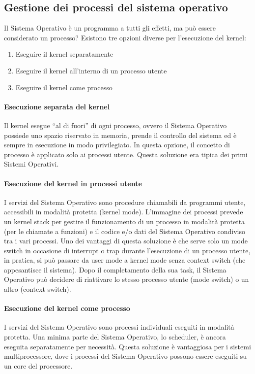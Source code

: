 \documentclass[a4paper]{article}
\begin{document}
\subsection{Gestione dei processi del sistema operativo}
Il Sistema Operativo è un programma a tutti gli effetti, ma può essere considerato un processo? Esistono tre opzioni diverse per l'esecuzione del kernel:
\begin{enumerate}
    \item Eseguire il kernel separatamente
    \item Eseguire il kernel all'interno di un processo utente
    \item Eseguire il kernel come processo
\end{enumerate}

\paragraph{Esecuzione separata del kernel} Il kernel esegue ``al di fuori'' di ogni processo, ovvero il Sistema Operativo possiede uno spazio riservato in memoria, prende il controllo del sistema ed è sempre in esecuzione in modo privilegiato. In questa opzione, il concetto di processo è applicato solo ai processi utente. Questa soluzione era tipica dei primi Sistemi Operativi.

\paragraph{Esecuzione del kernel in processi utente} I servizi del Sistema Operativo sono procedure chiamabili da programmi utente, accessibili in modalità protetta (kernel mode). L'immagine dei processi prevede un kernel stack per gestire il funzionamento di un processo in modalità protetta (per le chiamate a funzioni) e il codice e/o dati del Sistema Operativo condiviso tra i vari processi.
Uno dei vantaggi di questa soluzione è che serve solo un mode switch in occasione di interrupt o trap durante l'esecuzione di un processo utente, in pratica, si può passare da user mode a kernel mode senza context switch (che appesantisce il sistema). Dopo il completamento della sua task, il Sistema Operativo può decidere di riattivare lo stesso processo utente (mode switch) o un altro (context switch).

\paragraph{Esecuzione del kernel come processo} I servizi del Sistema Operativo sono processi individuali eseguiti in modalità protetta. Una minima parte del Sistema Operativo, lo scheduler, è ancora eseguita separatamente per necessità.
Questa soluzione è vantaggiosa per i sistemi multiprocessore, dove i processi del Sistema Operativo possono essere eseguiti su un core del processore.
\end{document}
